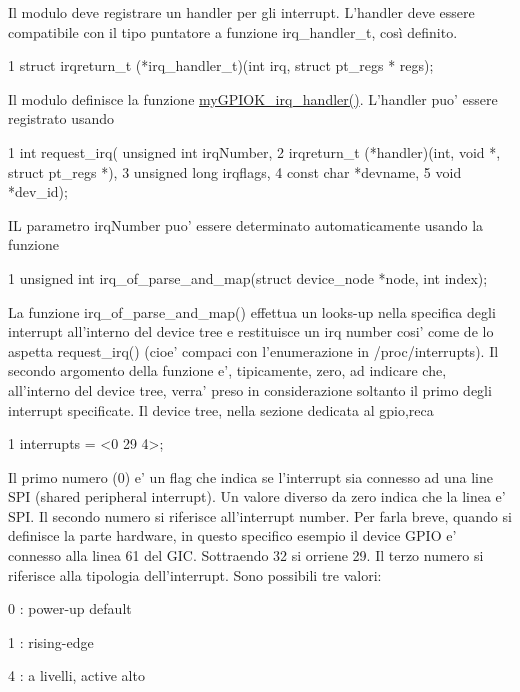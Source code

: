 Il modulo deve registrare un handler per gli interrupt. L'handler deve essere compatibile con il tipo puntatore a funzione irq\+\_\+handler\+\_\+t, così definito. 
\begin{DoxyCode}
1 struct irqreturn\_t (*irq\_handler\_t)(int irq, struct pt\_regs * regs);
\end{DoxyCode}
 Il modulo definisce la funzione \hyperlink{group___kernel-_module_ga2fc230a12a97aa63e43b2dc4aec73511}{my\+G\+P\+I\+O\+K\+\_\+irq\+\_\+handler()}. L'handler puo' essere registrato usando 
\begin{DoxyCode}
1 int request\_irq(    unsigned int irqNumber,
2                     irqreturn\_t (*handler)(int, void *, struct pt\_regs *),
3                     unsigned long irqflags,
4                     const char *devname,
5                     void *dev\_id);
\end{DoxyCode}
 I\+L parametro irq\+Number puo' essere determinato automaticamente usando la funzione 
\begin{DoxyCode}
1 unsigned int irq\_of\_parse\_and\_map(struct device\_node *node, int index);
\end{DoxyCode}
 La funzione irq\+\_\+of\+\_\+parse\+\_\+and\+\_\+map() effettua un looks-\/up nella specifica degli interrupt all'interno del device tree e restituisce un irq number cosi' come de lo aspetta request\+\_\+irq() (cioe' compaci con l'enumerazione in /proc/interrupts). Il secondo argomento della funzione e', tipicamente, zero, ad indicare che, all'interno del device tree, verra' preso in considerazione soltanto il primo degli interrupt specificate. Il device tree, nella sezione dedicata al gpio,reca 
\begin{DoxyCode}
1 interrupts = <0 29 4>;
\end{DoxyCode}
 Il primo numero (0) e' un flag che indica se l'interrupt sia connesso ad una line S\+P\+I (shared peripheral interrupt). Un valore diverso da zero indica che la linea e' S\+P\+I. Il secondo numero si riferisce all'interrupt number. Per farla breve, quando si definisce la parte hardware, in questo specifico esempio il device G\+P\+I\+O e' connesso alla linea 61 del G\+I\+C. Sottraendo 32 si orriene 29. Il terzo numero si riferisce alla tipologia dell'interrupt. Sono possibili tre valori\+:
\begin{DoxyItemize}
\item 0 \+: power-\/up default
\item 1 \+: rising-\/edge
\item 4 \+: a livelli, active alto
\end{DoxyItemize}

